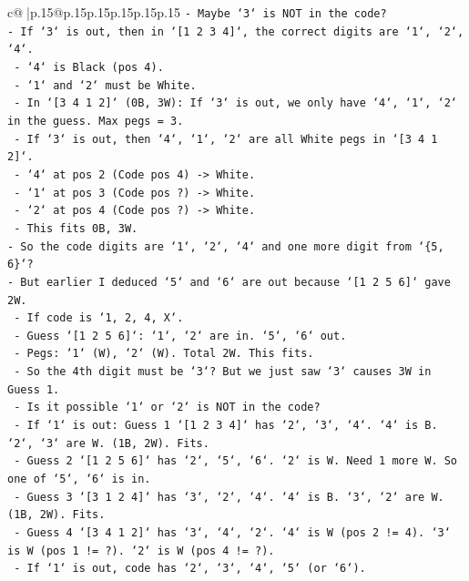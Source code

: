 \documentclass{article}
\begin{document}
{\begin{supertabular}{c@{$\;$}|p{.15\linewidth}@{}p{.15\linewidth}p{.15\linewidth}p{.15\linewidth}p{.15\linewidth}p{.15\linewidth}}
{{{\texttt{{-} Maybe `3` is NOT in the code?} \\
\texttt{{-} If `3` is out, then in `{[}1 2 3 4{]}`, the correct digits are `1`, `2`, `4`.} \\
\texttt{    {-} `4` is Black (pos 4).} \\
\texttt{    {-} `1` and `2` must be White.} \\
\texttt{    {-} In `{[}3 4 1 2{]}` (0B, 3W): If `3` is out, we only have `4`, `1`, `2` in the guess. Max pegs = 3.} \\
\texttt{    {-} If `3` is out, then `4`, `1`, `2` are all White pegs in `{[}3 4 1 2{]}`.} \\
\texttt{    {-} `4` at pos 2 (Code pos 4) {-}> White.} \\
\texttt{    {-} `1` at pos 3 (Code pos ?) {-}> White.} \\
\texttt{    {-} `2` at pos 4 (Code pos ?) {-}> White.} \\
\texttt{    {-} This fits 0B, 3W.} \\
\texttt{{-} So the code digits are `1`, `2`, `4` and one more digit from `\{5, 6\}`?} \\
\texttt{{-} But earlier I deduced `5` and `6` are out because `{[}1 2 5 6{]}` gave 2W.} \\
\texttt{    {-} If code is `1, 2, 4, X`.} \\
\texttt{    {-} Guess `{[}1 2 5 6{]}`: `1`, `2` are in. `5`, `6` out.} \\
\texttt{    {-} Pegs: `1` (W), `2` (W). Total 2W. This fits.} \\
\texttt{    {-} So the 4th digit must be `3`? But we just saw `3` causes 3W in Guess 1.} \\
\texttt{    {-} Is it possible `1` or `2` is NOT in the code?} \\
\texttt{    {-} If `1` is out: Guess 1 `{[}1 2 3 4{]}` has `2`, `3`, `4`. `4` is B. `2`, `3` are W. (1B, 2W). Fits.} \\
\texttt{    {-} Guess 2 `{[}1 2 5 6{]}` has `2`, `5`, `6`. `2` is W. Need 1 more W. So one of `5`, `6` is in.} \\
\texttt{    {-} Guess 3 `{[}3 1 2 4{]}` has `3`, `2`, `4`. `4` is B. `3`, `2` are W. (1B, 2W). Fits.} \\
\texttt{    {-} Guess 4 `{[}3 4 1 2{]}` has `3`, `4`, `2`. `4` is W (pos 2 != 4). `3` is W (pos 1 != ?). `2` is W (pos 4 != ?).} \\
\texttt{        {-} If `1` is out, code has `2`, `3`, `4`, `5` (or `6`).} \\
}}}
\end{supertabular}}
\end{document}
